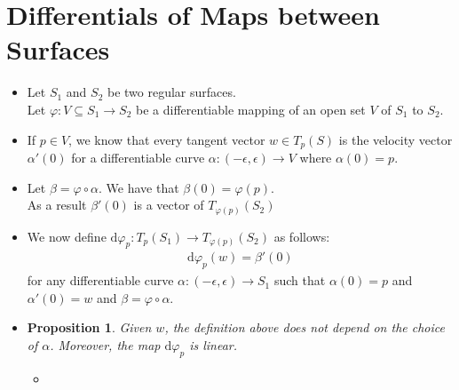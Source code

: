 \documentclass[10pt]{article}
\newtheorem{proposition}[lemma]{Proposition}
\newcommand{\dee}{\mathrm{d}}
\newcommand{\ra}{\rightarrow}
\newcommand{\sseq}{\subseteq}
\begin{document}
  \section{Differentials of Maps between Surfaces}
  \begin{itemize}
    \item Let $S_1$ and $S_2$ be two regular surfaces.\\
    Let $\varphi: V \sseq S_1 \ra S_2$ be a differentiable mapping of an open set $V$ of $S_1$ to $S_2$.

    \item If $p \in V$, we know that every tangent vector $w \in T_p(S)$ is the velocity vector $\alpha'(0)$ for a differentiable curve $\alpha: (-\epsilon, \epsilon) \ra V$ where $\alpha(0) = p$.

    \item Let $\beta = \varphi \circ \alpha$. We have that $\beta(0) = \varphi(p)$.\\
    As a result $\beta'(0)$ is a vector of $T_{\varphi(p)}(S_2)$

    \item We now define $\dee \varphi_{p}: T_p(S_1) \ra T_{\varphi(p)}(S_2)$ as follows:
    \begin{align*}
      \dee \varphi_p(w) = \beta'(0)
    \end{align*}
    for any differentiable curve $\alpha: (-\epsilon, \epsilon) \ra S_1$ such that $\alpha(0) = p$ and $\alpha'(0) = w$ and $\beta = \varphi \circ \alpha.$

    \item \begin{proposition}
      Given $w$, the definition above does not depend on the choice of $\alpha$. Moreover, the map $\dee \varphi_p$ is linear.
    \end{proposition}
    \begin{itemize}
      \item 
    \end{itemize}
  \end{itemize}
\end{document}
